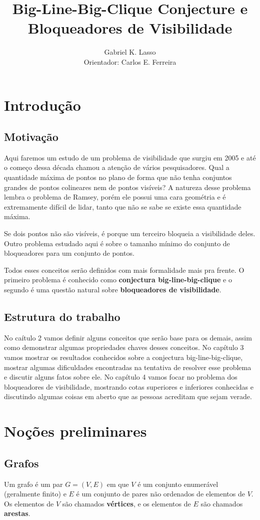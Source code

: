 \documentclass[a4paper]{book}
\title{\textbf{Big-Line-Big-Clique Conjecture e Bloqueadores de Visibilidade}}
\author{Gabriel K. Lasso\\ Orientador: Carlos E. Ferreira}
\date{}
\begin{document}
\maketitle
\tableofcontents
\chapter{Introdução}

\section{Motivação}
Aqui faremos um estudo de um problema de visibilidade que surgiu em 2005 e até o começo dessa década chamou a atenção de vários pesquisadores. Qual a quantidade máxima de pontos no plano de forma que não tenha conjuntos grandes de pontos colineares nem de pontos visíveis? A natureza desse problema lembra o problema de Ramsey, porém ele possui uma cara geométria e é extremamente difícil de lidar, tanto que não se sabe se existe essa quantidade máxima.

Se dois pontos não são visíveis, é porque um terceiro bloqueia a visibilidade deles. Outro problema estudado aqui é sobre o tamanho mínimo do conjunto de bloqueadores para um conjunto de pontos.

Todos esses conceitos serão definidos com mais formalidade mais pra frente. O primeiro problema é conhecido como \textbf{conjectura big-line-big-clique} e o segundo é uma questão natural sobre \textbf{bloqueadores de visibilidade}.


\section{Estrutura do trabalho}
No caítulo 2 vamos definir alguns conceitos que serão base para os demais, assim como demonstrar algumas propriedades chaves desses conceitos. No capítulo 3 vamos mostrar os resultados conhecidos sobre a conjectura big-line-big-clique, mostrar algumas dificuldades encontradas na tentativa de resolver esse problema e discutir alguns fatos sobre ele. No capítulo 4 vamos focar no problema dos bloqueadores de visibilidade, mostrando cotas superiores e inferiores conhecidas e discutindo algumas coisas em aberto que as pessoas acreditam que sejam verade.

\chapter{Noções preliminares}
\section{Grafos}
Um grafo é um par $G=(V,E)$ em que $V$ é um conjunto enumerável (geralmente finito) e $E$ é um conjunto de pares não ordenados de elementos de $V$. Os elementos de $V$ são chamados \textbf{vértices}, e os elementos de $E$ são chamados \textbf{arestas}.
\end{document}
